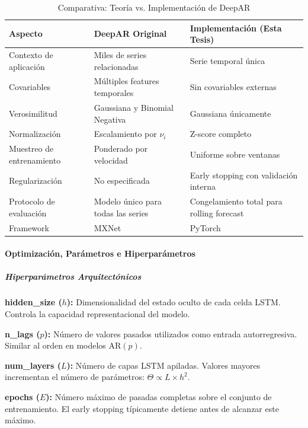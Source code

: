 \begin{table}[htbp]
\centering
\caption{Comparativa: Teoría vs. Implementación de DeepAR}
\label{tab:deepar_comparison}
\small
\begin{tabular}{>{\raggedright\arraybackslash}p{3.5cm}%
                >{\raggedright\arraybackslash}p{5cm}%
                >{\raggedright\arraybackslash}p{5cm}}
\toprule
\textbf{Aspecto} & \textbf{DeepAR Original} & \textbf{Implementación (Esta Tesis)} \\
\midrule
Contexto de aplicación & Miles de series relacionadas & Serie temporal única \\
Covariables & Múltiples features temporales & Sin covariables externas \\
Verosimilitud & Gaussiana y Binomial Negativa & Gaussiana únicamente \\
Normalización & Escalamiento por $\nu_i$ & Z-score completo \\
Muestreo de entrenamiento & Ponderado por velocidad & Uniforme sobre ventanas \\
Regularización & No especificada & Early stopping con validación interna \\
Protocolo de evaluación & Modelo único para todas las series & Congelamiento total para rolling forecast \\
Framework & MXNet & PyTorch \\
\bottomrule
\end{tabular}
\end{table}

\paragraph{Optimización, Parámetros e Hiperparámetros}

\subparagraph{Hiperparámetros Arquitectónicos}

\textbf{hidden\_size ($h$):} Dimensionalidad del estado oculto de cada celda LSTM. Controla la capacidad representacional del modelo.

\textbf{n\_lags ($p$):} Número de valores pasados utilizados como entrada autorregresiva. Similar al orden en modelos AR$(p)$.

\textbf{num\_layers ($L$):} Número de capas LSTM apiladas. Valores mayores incrementan el número de parámetros: $\Theta \propto L \times h^2$.

\textbf{epochs ($E$):} Número máximo de pasadas completas sobre el conjunto de entrenamiento. El early stopping típicamente detiene antes de alcanzar este máximo.


